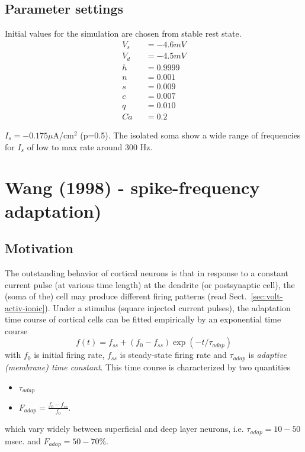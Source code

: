 \subsection{Parameter settings}
\label{sec:parameter-settings}

Initial values for the simulation are chosen from stable rest state.
\begin{eqnarray*}
  V_s &&= -4.6 mV \\
  V_d &&= -4.5 mV \\
  h &&= 0.9999 \\
  n  &&= 0.001 \\
  s &&= 0.009 \\
  c &&= 0.007 \\
  q &&= 0.010 \\
  Ca &&= 0.2 
\end{eqnarray*}

$I_s=-0.175\mu$A/cm$^2$ (p=0.5). The isolated soma show a wide range
of frequencies for $I_s$ of low to max rate around 300 Hz.


\section{Wang (1998) - spike-frequency adaptation)}
\label{sec:wang-model}

\subsection{Motivation}
\label{sec:motivation}


The outstanding behavior of cortical neurons is that in response to a
constant current pulse (at various time length) at the dendrite (or
postsynaptic cell), the (soma of the) cell may produce different
firing patterns (read Sect.~\ref{sec:volt-activ-ionic}).  Under a
stimulus (square injected current pulses), the adaptation time course
of cortical cells can be fitted empirically by an exponential time
course
\begin{equation}
  \label{eq:339}
  f(t) = f_{ss} + (f_0-f_{ss}) \exp(-t/\tau_{adap})
\end{equation}
with $f_0$ is initial firing rate, $f_{ss}$ is steady-state firing
rate and $\tau_{adap}$ is {\it adaptive (membrane) time constant}. This time
course is characterized by two quantities
\begin{itemize}
\item $\tau_{adap}$
\item $F_{adap} = \frac{f_0-f_{ss}}{f_0}$. 
\end{itemize}
which vary widely between superficial and deep layer neurons,
i.e. $\tau_{adap}=10-50$msec. and $F_{adap}=50-70$\%.

